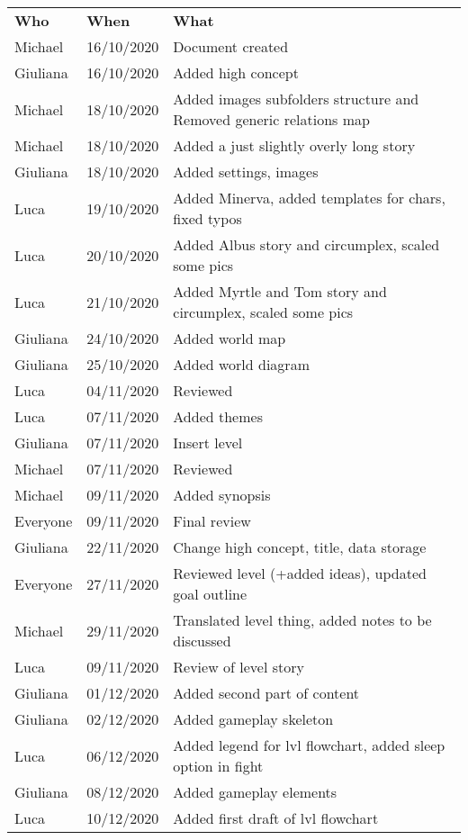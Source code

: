 \begin{longtable}{ m{2cm}m{3cm}m{8cm}} 
\centering 
 \textbf{Who}& \textbf{When} & \textbf{What}\\
Michael  & 16/10/2020 & Document created \\
Giuliana & 16/10/2020 & Added high concept \\
Michael  & 18/10/2020 & Added images subfolders structure and Removed generic relations map \\
Michael  & 18/10/2020 & Added a just slightly overly long story \\
Giuliana & 18/10/2020 & Added settings, images \\
Luca     & 19/10/2020 & Added Minerva, added templates for chars, fixed typos  \\
Luca     & 20/10/2020 & Added Albus story and circumplex, scaled some pics \\
Luca     & 21/10/2020 & Added Myrtle and Tom story and circumplex, scaled some pics \\
Giuliana & 24/10/2020 & Added world map \\
Giuliana & 25/10/2020 & Added world diagram \\
Luca     & 04/11/2020 & Reviewed \\
Luca     & 07/11/2020 & Added themes \\
Giuliana & 07/11/2020 & Insert level \\
Michael  & 07/11/2020 & Reviewed \\
Michael  & 09/11/2020 & Added synopsis \\
Everyone & 09/11/2020 & Final review \\
Giuliana & 22/11/2020 & Change high concept, title, data storage \\
Everyone & 27/11/2020 & Reviewed level (+added ideas), updated goal outline \\
Michael  & 29/11/2020 & Translated level thing, added notes to be discussed\\
Luca     & 09/11/2020 & Review of level story\\
Giuliana & 01/12/2020 & Added second part of content\\
Giuliana & 02/12/2020 & Added gameplay skeleton\\
Luca     & 06/12/2020 & Added legend for lvl flowchart, added sleep option in fight \\
Giuliana & 08/12/2020 & Added gameplay elements\\
Luca     & 10/12/2020 & Added first draft of lvl flowchart\\

\end{longtable}
